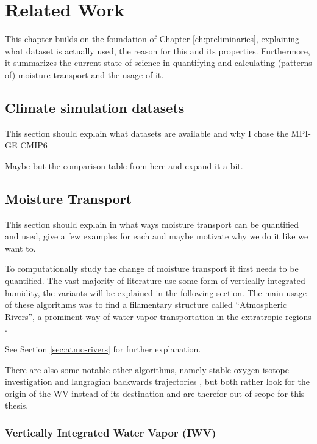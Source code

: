 \chapter{Related Work}
\label{ch:related_work}

This chapter builds on the foundation of Chapter \ref{ch:preliminaries}, explaining what dataset is actually used, the reason for this and its properties. 
Furthermore, it summarizes the current state-of-science in quantifying and calculating (patterns of) moisture transport and the usage of it.  


\section{Climate simulation datasets}


This section should explain what datasets are available and why I chose the MPI-GE CMIP6 \cite{olonscheck_new_2023}

Maybe but the comparison table from \cite{olonscheck_new_2023} here and expand it a bit. 


\section{Moisture Transport}

This section should explain in what ways moisture transport can be quantified and used, give a few examples for each and maybe motivate  why we do it like we want to. 

To computationally study the change of moisture transport it first needs to be quantified. 
The vast majority of literature use some form of vertically integrated humidity, the variants will be explained in the following section.  
The main usage of these algorithms was to find a filamentary structure called \enquote{Atmospheric Rivers}, a prominent way of water vapor transportation in the extratropic regions \cite{gimeno_atmospheric_2014}. 

See Section \ref{sec:atmo-rivers} for further explanation. 


There are also some notable other algorithms, namely stable oxygen isotope investigation \cite{ma_atmospheric_nodate} and langragian backwards trajectories \cite{zhao_lagrangian_2021}, but both rather look for the origin of the WV instead of its destination and are therefor out of scope for this thesis.

\subsection{Vertically Integrated Water Vapor (IWV)}

